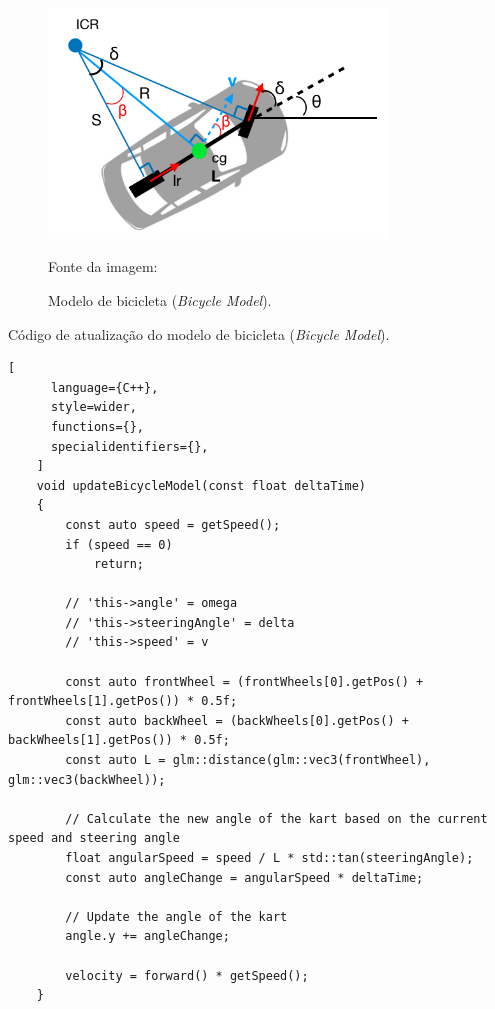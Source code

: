 \begin{figure}[H]
    \centering
    \includegraphics[width=0.8\textwidth]{figuras/Bicycle Model.png}
    \caption{Modelo de bicicleta (\textit{Bicycle Model}).}
    \footnotesize{Fonte da imagem: \cite{bicycleModel}}
    \label{fig:bicycle-model}
\end{figure}

\begin{programruledcaption}{Código de atualização do modelo de bicicleta (\textit{Bicycle Model}).\label{prog:bicycle}}
    \begin{lstlisting}[
      language={C++},
      style=wider,
      functions={},
      specialidentifiers={},
    ]
    void updateBicycleModel(const float deltaTime)
    {
        const auto speed = getSpeed();
        if (speed == 0)
            return;
    
        // 'this->angle' = omega
        // 'this->steeringAngle' = delta
        // 'this->speed' = v
    
        const auto frontWheel = (frontWheels[0].getPos() + frontWheels[1].getPos()) * 0.5f;
        const auto backWheel = (backWheels[0].getPos() + backWheels[1].getPos()) * 0.5f;
        const auto L = glm::distance(glm::vec3(frontWheel), glm::vec3(backWheel));
    
        // Calculate the new angle of the kart based on the current speed and steering angle
        float angularSpeed = speed / L * std::tan(steeringAngle);
        const auto angleChange = angularSpeed * deltaTime;
    
        // Update the angle of the kart
        angle.y += angleChange;
    
        velocity = forward() * getSpeed();
    }
    \end{lstlisting}
\end{programruledcaption}

